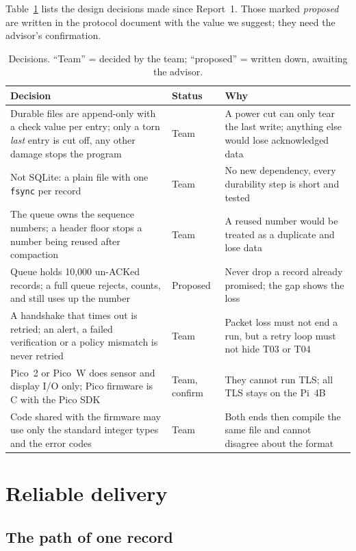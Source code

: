 \documentclass[11pt,a4paper]{article}
\newcommand{\prog}[1]{\texttt{#1}}
\begin{document}
Table~\ref{tab:decisions} lists the design decisions made since Report~1. Those marked
\emph{proposed} are written in the protocol document with the value we suggest; they need the
advisor's confirmation.

\begin{table}[!htbp]
\centering
\caption{Decisions. ``Team'' = decided by the team; ``proposed'' = written down, awaiting the advisor.}
\label{tab:decisions}
\small
\begin{tabularx}{\linewidth}{@{}X>{\raggedright\arraybackslash}p{1.7cm}X@{}}
\toprule
Decision & Status & Why \\
\midrule
Durable files are append-only with a check value per entry; only a torn \emph{last} entry is
cut off, any other damage stops the program & Team &
A power cut can only tear the last write; anything else would lose acknowledged data \\
Not SQLite: a plain file with one \prog{fsync} per record & Team & No new dependency, every
durability step is short and tested \\
The queue owns the sequence numbers; a header floor stops a number being reused after compaction
& Team & A reused number would be treated as a duplicate and lose data \\
Queue holds 10{,}000 un-ACKed records; a full queue rejects, counts, and still uses up the number
& Proposed & Never drop a record already promised; the gap shows the loss \\
A handshake that times out is retried; an alert, a failed verification or a policy mismatch is
never retried & Team & Packet loss must not end a run, but a retry loop must not hide T03 or T04 \\
Pico~2 or Pico~W does sensor and display I/O only; Pico firmware is C with the Pico SDK
& Team, confirm & They cannot run TLS; all TLS stays on the Pi~4B \\
Code shared with the firmware may use only the standard integer types and the error codes
& Team & Both ends then compile the same file and cannot disagree about the format \\
\bottomrule
\end{tabularx}
\end{table}

\section{Reliable delivery}

\subsection{The path of one record}
\end{document}
